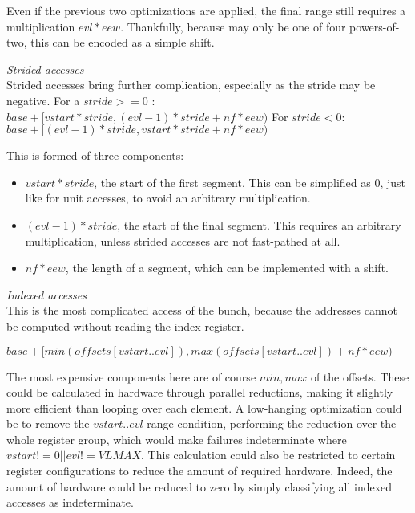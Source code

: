 Even if the previous two optimizations are applied, the final range still requires a multiplication $evl * eew$.
Thankfully, because  may only be one of four powers-of-two, this can be encoded as a simple shift.


\noindent\emph{Strided accesses}\\
\noindent Strided accesses bring further complication, especially as the stride may be negative.
For a $stride >= 0$ : $base + [vstart * stride, (evl - 1) * stride + nf * eew)$
For $stride < 0$: $base + [(evl - 1) * stride, vstart * stride + nf * eew)$

This is formed of three components:
\begin{itemize}
    \item $vstart * stride$, the start of the first segment. This can be simplified as 0, just like for unit accesses, to avoid an arbitrary multiplication.
    \item $(evl - 1) * stride$, the start of the final segment. This requires an arbitrary multiplication, unless strided accesses are not fast-pathed at all.
    \item $nf * eew$, the length of a segment, which can be implemented with a shift.
\end{itemize}


\noindent\emph{Indexed accesses}\\
\noindent This is the most complicated access of the bunch, because the addresses cannot be computed without reading the index register.

$base + [min(offsets[vstart..evl]), max(offsets[vstart..evl]) + nf * eew)$

The most expensive components here are of course $min,max$ of the offsets.
These could be calculated in hardware through parallel reductions, making it slightly more efficient than looping over each element.
A low-hanging optimization could be to remove the $vstart..evl$ range condition, performing the reduction over the whole register group, which would make failures indeterminate where $vstart != 0 || evl != VLMAX$.
This calculation could also be restricted to certain register configurations to reduce the amount of required hardware.
Indeed, the amount of hardware could be reduced to zero by simply classifying all indexed accesses as indeterminate.

